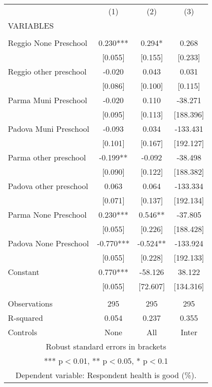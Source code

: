 \begin{tabular}{lccc} \hline
 & (1) & (2) & (3) \\
VARIABLES &  &  &  \\ \hline
 &  &  &  \\
Reggio None Preschool & 0.230*** & 0.294* & 0.268 \\
 & [0.055] & [0.155] & [0.233] \\
Reggio other preschool & -0.020 & 0.043 & 0.031 \\
 & [0.086] & [0.100] & [0.115] \\
Parma Muni Preschool & -0.020 & 0.110 & -38.271 \\
 & [0.095] & [0.113] & [188.396] \\
Padova Muni Preschool & -0.093 & 0.034 & -133.431 \\
 & [0.101] & [0.167] & [192.127] \\
Parma other preschool & -0.199** & -0.092 & -38.498 \\
 & [0.090] & [0.122] & [188.382] \\
Padova other preschool & 0.063 & 0.064 & -133.334 \\
 & [0.071] & [0.137] & [192.134] \\
Parma None Preschool & 0.230*** & 0.546** & -37.805 \\
 & [0.055] & [0.226] & [188.428] \\
Padova None Preschool & -0.770*** & -0.524** & -133.924 \\
 & [0.055] & [0.228] & [192.133] \\
Constant & 0.770*** & -58.126 & 38.122 \\
 & [0.055] & [72.607] & [134.316] \\
 &  &  &  \\
Observations & 295 & 295 & 295 \\
R-squared & 0.054 & 0.237 & 0.355 \\
 Controls & None & All & Inter \\ \hline
\multicolumn{4}{c}{ Robust standard errors in brackets} \\
\multicolumn{4}{c}{ *** p$<$0.01, ** p$<$0.05, * p$<$0.1} \\
\multicolumn{4}{c}{ Dependent variable: Respondent health is good (\%).} \\
\end{tabular}
